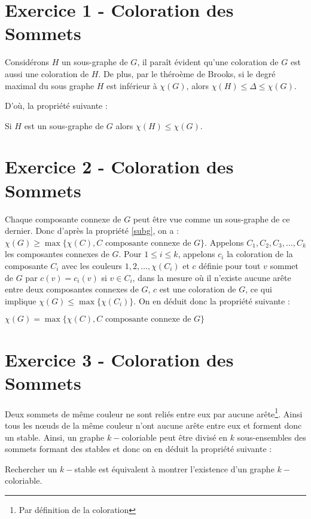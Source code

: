 
\section{Exercice 1 - Coloration des Sommets}

Considérons $H$ un sous-graphe de $G$, il paraît évident qu'une coloration de $G$ est aussi une
coloration de $H$. De plus, par le théroème de Brooks, si le degré maximal du sous graphe $H$ est
inférieur à $\chi(G)$, alors $\chi(H) \leq \Delta \leq \chi(G)$.

D'où, la propriété suivante :

\begin{prop}
	\label{subg}
	Si $H$ est un sous-graphe de $G$ alors $\chi(H) \leq \chi(G)$.
\end{prop}

\section{Exercice 2 - Coloration des Sommets}

Chaque composante connexe de $G$ peut être vue comme un sous-graphe de ce dernier. Donc d'après la
propriété \ref{subg}, on a : $\chi(G) \geq \max\{\chi(C), C\mbox{ composante connexe de }G\}$.
Appelons $C_1, C_2, C_3, \dots, C_k$ les composantes connexes de $G$. Pour $1 \leq i \leq k$,
appelons $c_i$ la coloration de la composante $C_i$ avec les couleurs $1, 2, \dots, \chi(C_i)$ et
$c$ définie pour tout $v$ sommet de $G$ par $c(v) = c_i(v)$ si $v \in C_i$, dans la mesure où il
n'existe aucune arête entre deux composantes connexes de $G$, $c$ est une coloration de $G$, ce qui
implique $\chi(G) \leq \max\{\chi(C_i)\}$. On en déduit donc la propriété suivante :

\begin{prop}
	\label{maxcon}
	$\chi(G) = \max\{\chi(C), C \mbox{ composante connexe de }G\}$
\end{prop}

\section{Exercice 3 - Coloration des Sommets}

Deux sommets de même couleur ne sont reliés entre eux par aucune arête\footnote{Par définition de la
coloration}. Ainsi tous les n\oe uds de la même couleur n'ont aucune arête entre eux et forment donc un
stable. Ainsi, un graphe $k-$coloriable peut être divisé en $k$ sous-ensembles des sommets formant
des stables et donc on en déduit la propriété suivante :

\begin{prop}
	\label{equiv}
	Rechercher un $k-$stable est équivalent à montrer l'existence d'un graphe $k-$coloriable.
\end{prop}


